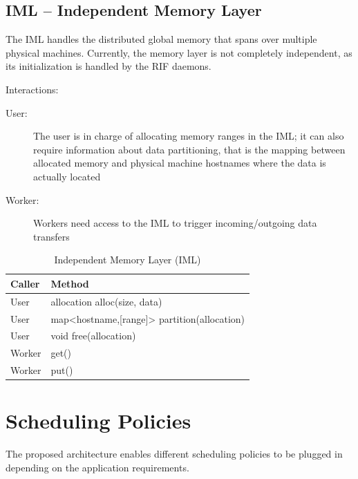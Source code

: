 \documentclass[10pt]{article}
\newcommand{\user}{User\xspace}
\newcommand{\worker}{Worker\xspace}
\newcommand{\iml}{IML\xspace}
\newcommand{\rif}{RIF\xspace}
\begin{document}
\subsection{IML -- Independent Memory Layer}
The \iml handles the distributed global memory that spans over multiple 
physical machines.
Currently, the memory layer is not completely independent, as its 
initialization is handled by the \rif daemons. 

Interactions:
\begin{description}
    \item [\user:] The user is in charge of allocating memory ranges in the
    \iml; it can also require information about data partitioning, that is the
    mapping between allocated memory and physical machine hostnames where the 
    data is actually located
    \item [\worker:] Workers need access to the \iml to trigger
    incoming/outgoing data transfers
\end{description}
%
\begin{table}[ht]
    \centering
    \caption{Independent Memory Layer (IML)}
    \label{tab:iml}
    \bgroup
    \setlength{\tabcolsep}{2em}
    \begin{tabular}{ll}
        \toprule
        Caller & Method \\
        \midrule
        \user & allocation alloc(size, data) \\
        \user & map<hostname,[range]> partition(allocation) \\
        \user & void free(allocation)  \\
        \worker & get() \\
        \worker & put() \\
        \bottomrule
    \end{tabular}
    \egroup
\end{table}
%



\section{Scheduling Policies}

The proposed architecture enables different scheduling policies to be plugged 
in depending on the application requirements.
\end{document}
